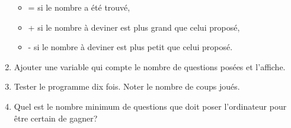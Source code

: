 \documentclass[a4paper,11pt]{article}
\begin{document}
\begin{Form}
\begin{exo}
\begin{enumerate}
\begin{itemize}
\item = si le nombre a été trouvé,
\item + si le nombre à deviner est plus grand que celui proposé,
\item - si le nombre à deviner est plus petit que celui proposé.
\end{itemize}
\item Ajouter une variable qui compte le nombre de questions posées et l'affiche.
\item Tester le programme dix fois. Noter le nombre de coups joués.
\item Quel est le nombre minimum de questions que doit poser l'ordinateur pour être certain de gagner? 
\end{enumerate}
\end{exo}
\end{Form}
\end{document}
